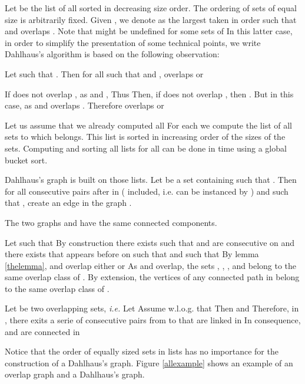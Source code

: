 \documentclass{llncs}
\begin{document}
Let  be the list of all  sorted in
decreasing size order. The ordering of sets of equal size is arbitrarily
fixed. Given , we denote  as the largest
 taken in  order such that  and 
overlaps . Note that  might be undefined for some
sets of  In this latter case, in order to simplify the
presentation of some technical points, we write
 Dahlhaus's algorithm is based on the
following observation:

\begin{lemma}
\label{thelemma}
Let  such that . Then for
all  such that  and ,  overlaps  or 
\end{lemma}
\begin{preuve}
If  does not overlap , as  and ,  Thus  Then, if  does not overlap , then
. But in this case, as   and overlaps . Therefore 
overlaps  or 
\end{preuve}

Let us assume that we already computed all  For each
 we compute the list  of all sets  to which  belongs. This list is sorted in increasing order of
the sizes of the sets. Computing and sorting all lists for all  can be done in  time using a global bucket
sort.

Dahlhaus's graph  is built on those lists. Let  be a set
containing  such that . Then for all
consecutive pairs  after  in  ( included, i.e. 
can be instanced by ) and such that ,
create an edge  in the graph .


\begin{lemma}
The two graphs  and  have the same
connected components.
\label{samecomponent}
\end{lemma}
\begin{preuve}
 Let  such that  By construction there exists  such that  and  are
consecutive on  and there exists  that appears before
 on  such that  and such that
 By lemma \ref{thelemma},
 and  overlap either  or  As  and
 overlap, the sets , , , and  belong to
the same overlap class of . By extension, the vertices
of any connected path in  belong to the same overlap
class of . 

\noindent
 Let  be two overlapping sets, {\em
  i.e. }  Let  Assume w.l.o.g. that
   Then  and  Therefore, in , there exits a serie of consecutive
  pairs  from  to  that are linked in  In
  consequence,  and  are connected in 
\end{preuve}


Notice that the order of equally sized sets in  lists has no
importance for the construction of a Dahlhaus's graph. Figure
\ref{allexample} shows an example of an overlap graph and a Dahlhaus's
graph.
\end{document}
